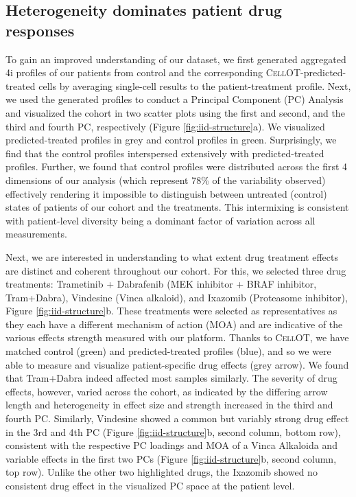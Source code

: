 \subsection{Heterogeneity dominates patient drug responses}
To gain an improved understanding of our dataset, we first generated aggregated 4i profiles of our patients from control and the corresponding \textsc{CellOT}-predicted-treated cells by averaging single-cell results to the patient-treatment profile.
Next, we used the generated profiles to conduct a Principal Component (PC) Analysis and visualized the cohort in two scatter plots using the first and second, and the third and fourth PC, respectively (Figure \ref{fig:iid-structure}a).
We visualized predicted-treated profiles in grey and control profiles in green.
Surprisingly, we find that the control profiles interspersed extensively with predicted-treated profiles.
Further, we found that control profiles were distributed across the first 4 dimensions of our analysis (which represent 78\% of the variability observed) effectively rendering it impossible to distinguish between untreated (control) states of patients of our cohort and the treatments.
This intermixing is consistent with patient-level diversity being a dominant factor of variation across all measurements.

Next, we are interested in understanding to what extent drug treatment effects are distinct and coherent throughout our cohort.
For this, we selected three drug treatments: Trametinib + Dabrafenib (MEK inhibitor + BRAF inhibitor, Tram+Dabra), Vindesine (Vinca alkaloid), and Ixazomib (Proteasome inhibitor), Figure \ref{fig:iid-structure}b.
These treatments were selected as representatives as they each have a different mechanism of action (MOA) and are indicative of the various effects strength measured with our platform.
Thanks to \textsc{CellOT}, we have matched control (green) and predicted-treated profiles (blue), and so we were able to measure and visualize patient-specific drug effects (grey arrow).
 We found that Tram+Dabra indeed affected most samples similarly.
The severity of drug effects, however, varied across the cohort, as indicated by the differing arrow length and heterogeneity in effect size and strength increased in the third and fourth PC.
 Similarly, Vindesine showed a common but variably strong drug effect in the 3rd and 4th PC (Figure \ref{fig:iid-structure}b, second column, bottom row), consistent with the respective PC loadings and MOA of a Vinca Alkaloida \cite{dhyani2022} and variable effects in the first two PCs (Figure \ref{fig:iid-structure}b, second column, top row).
 Unlike the other two highlighted drugs, the Ixazomib showed no consistent drug effect in the visualized PC space at the patient level.  

